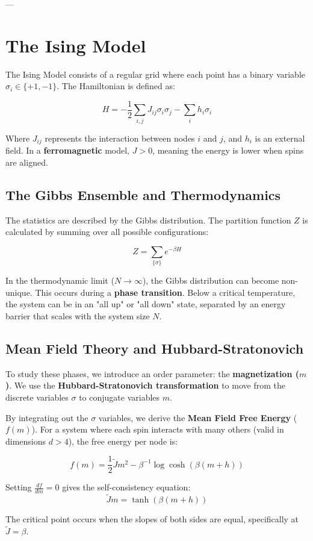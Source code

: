 ---

\section{The Ising Model}
The Ising Model consists of a regular grid where each point has a binary variable $\sigma_i \in \{+1, -1\}$. The Hamiltonian is defined as:

\[ H = -\frac{1}{2} \sum_{i,j} J_{ij} \sigma_i \sigma_j - \sum_i h_i \sigma_i \]

Where $J_{ij}$ represents the interaction between nodes $i$ and $j$, and $h_i$ is an external field. In a \textbf{ferromagnetic} model, $J > 0$, meaning the energy is lower when spins are aligned.

\subsection{The Gibbs Ensemble and Thermodynamics}
The statistics are described by the Gibbs distribution. The partition function $Z$ is calculated by summing over all possible configurations:

\[ Z = \sum_{\{\sigma\}} e^{-\beta H} \]

In the thermodynamic limit ($N \to \infty$), the Gibbs distribution can become non-unique. This occurs during a \textbf{phase transition}. Below a critical temperature, the system can be in an "all up" or "all down" state, separated by an energy barrier that scales with the system size $N$.

\subsection{Mean Field Theory and Hubbard-Stratonovich}
To study these phases, we introduce an order parameter: the \textbf{magnetization ($m$)}. We use the \textbf{Hubbard-Stratonovich transformation} to move from the discrete variables $\sigma$ to conjugate variables $m$.

By integrating out the $\sigma$ variables, we derive the \textbf{Mean Field Free Energy} ($f(m)$). For a system where each spin interacts with many others (valid in dimensions $d > 4$), the free energy per node is:

\[ f(m) = \frac{1}{2} \tilde{J} m^2 - \beta^{-1} \log \cosh(\beta (m + h)) \]

Setting $\frac{df}{dm} = 0$ gives the self-consistency equation:
\[ \tilde{J}m = \tanh(\beta(m + h)) \]

The critical point occurs when the slopes of both sides are equal, specifically at $\tilde{J} = \beta$.

